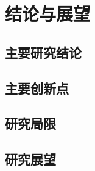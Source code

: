 \chapter{结论与展望}
\label{chap:conclusions}

\section{主要研究结论}
\ThesisBlank

\section{主要创新点}
\ThesisBlank

\section{研究局限}
\ThesisBlank

\section{研究展望}
\ThesisBlank
